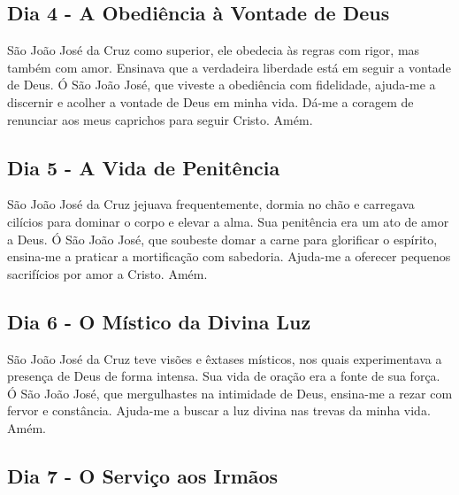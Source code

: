 \documentclass[a4paper,14pt]{extarticle} \usepackage[utf8]{inputenc}
\begin{document}
\underline{}


\subsection{Dia 4 - A Obediência à Vontade de Deus}


\underline{}

São João José da Cruz como superior, ele obedecia às regras com rigor, mas também com amor. Ensinava que a verdadeira liberdade está em seguir a vontade de Deus.
Ó São João José, que viveste a obediência com fidelidade, ajuda-me a discernir e acolher a vontade de Deus em minha vida. Dá-me a coragem de renunciar aos meus caprichos para seguir Cristo. Amém.


\underline{}


\subsection{Dia 5 - A Vida de Penitência}


\underline{}

São João José da Cruz jejuava frequentemente, dormia no chão e carregava cilícios para dominar o corpo e elevar a alma. Sua penitência era um ato de amor a Deus.
Ó São João José, que soubeste domar a carne para glorificar o espírito, ensina-me a praticar a mortificação com sabedoria. Ajuda-me a oferecer pequenos sacrifícios por amor a Cristo. Amém.


\underline{}


\subsection{Dia 6 - O Místico da Divina Luz}


\underline{}

São João José da Cruz teve visões e êxtases místicos, nos quais experimentava a presença de Deus de forma intensa. Sua vida de oração era a fonte de sua força.
Ó São João José, que mergulhastes na intimidade de Deus, ensina-me a rezar com fervor e constância. Ajuda-me a buscar a luz divina nas trevas da minha vida. Amém.


\underline{}


\subsection{Dia 7 - O Serviço aos Irmãos}
\end{document}
